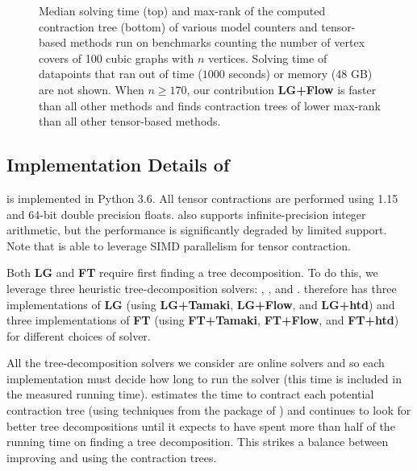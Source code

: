 \begin{figure}
	\centering
	
	
	\caption{\label{fig:cubic-time} Median solving time (top) and max-rank of the computed contraction tree (bottom) of various model counters and tensor-based methods run on benchmarks counting the number of vertex covers of 100 cubic graphs with $n$ vertices. Solving time of datapoints that ran out of time ($1000$ seconds) or memory (48 GB) are not shown. When $n \geq 170$, our contribution \textbf{LG+Flow} is faster than all other methods and finds contraction trees of lower max-rank than all other tensor-based methods.}
\end{figure}

\subsection{Implementation Details of }
\label{sec:tensors:experiments:implementation}
 is implemented in Python 3.6. All tensor contractions are performed using  1.15 and 64-bit double precision floats.  also supports infinite-precision integer arithmetic, but the performance is significantly degraded by limited  support. Note that  is able to leverage SIMD parallelism for tensor contraction.

Both \textbf{LG} and \textbf{FT} require first finding a tree decomposition. To do this, we leverage three heuristic tree-decomposition solvers:  \cite{Tamaki17},  \cite{HS18}, and  \cite{AMW17}.  therefore has three implementations of \textbf{LG} (using \textbf{LG+Tamaki}, \textbf{LG+Flow}, and \textbf{LG+htd}) and three implementations of \textbf{FT} (using \textbf{FT+Tamaki}, \textbf{FT+Flow}, and \textbf{FT+htd}) for different choices of solver.

All the tree-decomposition solvers we consider are online solvers and so each implementation must decide how long to run the solver (this time is included in the measured running time).  estimates the time to contract each potential contraction tree (using techniques from the  package of ) and continues to look for better tree decompositions until it expects to have spent more than half of the running time on finding a tree decomposition.  This strikes a balance between improving and using the contraction trees.

